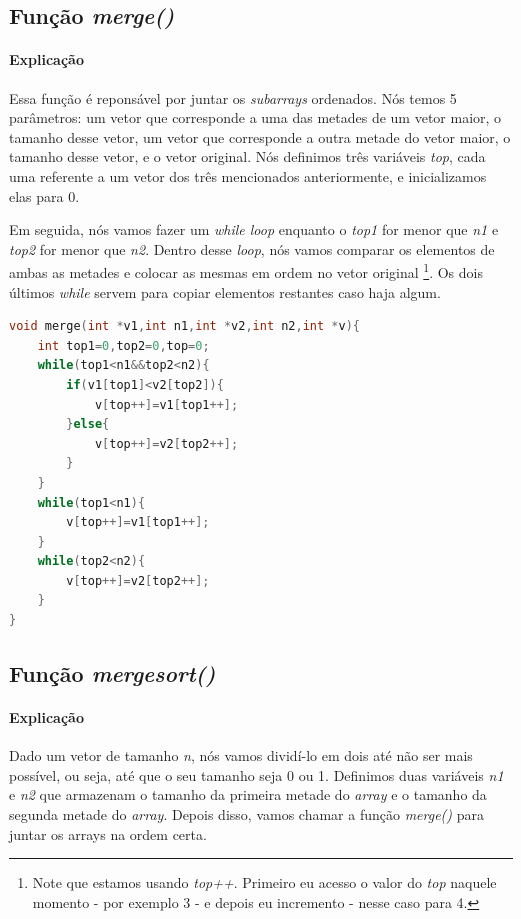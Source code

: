 \subsection{Função \textit{merge()}}
\paragraph{Explicação}
Essa função é reponsável por juntar os \textit{subarrays} ordenados. Nós temos 5 parâmetros: um vetor que corresponde a uma das metades de um vetor maior, o tamanho desse vetor,
um vetor que corresponde a outra metade do vetor maior, o tamanho desse vetor, e o vetor original. Nós definimos três variáveis \textit{top}, cada uma referente a um vetor dos três
mencionados anteriormente, e inicializamos elas para 0.

Em seguida, nós vamos fazer um \textit{while loop} enquanto o \textit{top1} for menor que \textit{n1} e \textit{top2} for menor que \textit{n2}. Dentro desse \textit{loop}, nós
vamos comparar os elementos de ambas as metades e colocar as mesmas em ordem no vetor original \footnote{Note que estamos usando \textit{top++}. Primeiro eu acesso o valor do
\textit{top} naquele momento - por exemplo 3 -  e depois eu incremento - nesse caso para 4.}. Os dois últimos \textit{while} servem para copiar elementos restantes caso haja algum.

\begin{lstlisting}[language=C]
void merge(int *v1,int n1,int *v2,int n2,int *v){
    int top1=0,top2=0,top=0;
    while(top1<n1&&top2<n2){
        if(v1[top1]<v2[top2]){
            v[top++]=v1[top1++];
        }else{
            v[top++]=v2[top2++];
        }
    }
    while(top1<n1){
        v[top++]=v1[top1++];
    }
    while(top2<n2){
        v[top++]=v2[top2++];
    }
}

\end{lstlisting}

\subsection{Função \textit{mergesort()}}
\paragraph{Explicação}
Dado um vetor de tamanho \textit{n}, nós vamos dividí-lo em dois até não ser mais possível, ou seja, até que o seu tamanho seja 0 ou 1. Definimos duas variáveis \textit{n1} e \textit{n2}
que armazenam o tamanho da primeira metade do \textit{array} e o tamanho da segunda metade do \textit{array}. Depois disso, vamos chamar a função \textit{merge()} para juntar os arrays
na ordem certa.


